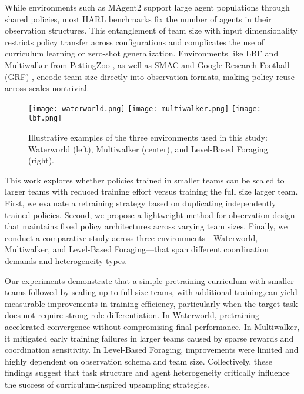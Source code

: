 \documentclass{article}
\begin{document}
While environments such as MAgent2 \cite{zheng2017} support large agent populations through 
shared policies, most HARL benchmarks fix the number of agents in their observation structures. 
This entanglement of team size with input dimensionality restricts policy transfer across 
configurations and complicates the use of curriculum learning or zero-shot generalization. 
Environments like LBF and Multiwalker from PettingZoo \cite{terry2021}, as well as 
SMAC \cite{samvelyan2019} and Google Research Football (GRF) \cite{kurach2020}, 
encode team size directly into observation formats, making policy reuse across scales nontrivial.


\begin{figure}[h]
    \centering
    \texttt{[image: waterworld.png]}
    \hfill
    \texttt{[image: multiwalker.png]}
    \hfill
    \texttt{[image: lbf.png]}
    \caption{Illustrative examples of the three environments used in this study: Waterworld (left), Multiwalker (center), and Level-Based Foraging (right).}
    \label{fig:envs-overview}
\end{figure}

This work explores whether policies trained in smaller teams can be scaled to larger teams 
with reduced training effort versus training the full size larger team. First, 
we evaluate a retraining strategy based on duplicating independently trained policies. 
Second, we propose a lightweight method for observation design that maintains fixed policy 
architectures across varying team sizes. Finally, we conduct a comparative study across 
three environments—Waterworld, Multiwalker, and Level-Based Foraging—that span different 
coordination demands and heterogeneity types.

Our experiments demonstrate that a simple pretraining curriculum with smaller teams followed by 
scaling up to full size teams, with additional training,can yield measurable improvements in 
training efficiency, particularly when the target task does not require strong role 
differentiation. 
In Waterworld, pretraining accelerated convergence without compromising final performance. 
In Multiwalker, it mitigated early training failures in larger teams caused by sparse 
rewards and coordination sensitivity. 
In Level-Based Foraging, improvements were limited and highly dependent on 
observation schema and team size. 
Collectively, these findings suggest that task structure and agent heterogeneity 
critically influence the success of curriculum-inspired upsampling strategies.
\end{document}

